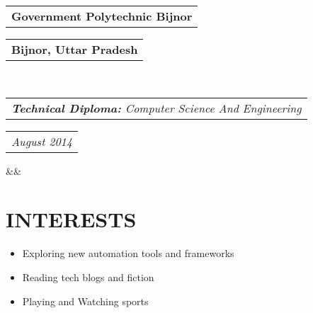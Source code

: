 \documentclass[11pt,a4paper]{moderncv}
\makeatletter
\newcommand*{\customcventry}[7][.25em]{
  \begin{tabular}{@{}l} 
    {\bfseries #4}
  \end{tabular}
  \hfill
  \begin{tabular}{l@{}}
     {\bfseries #5}
  \end{tabular} \\
  \begin{tabular}{@{}l} 
    {\itshape #3}
  \end{tabular}
  \hfill
  \begin{tabular}{l@{}}
     {\itshape #2}
  \end{tabular}
  \ifx&#7&%
  \else{\\%
    \begin{minipage}{\maincolumnwidth}%
      \small#7%
    \end{minipage}}\fi%
  \par\addvspace{#1}}
\makeatother
\begin{document}
{\customcventry{August 2014}{\textbf {Technical Diploma:} Computer Science And Engineering}{Government Polytechnic Bijnor}{Bijnor, Uttar Pradesh}{}{}}
\vspace{-2mm}

\section{INTERESTS}
\vspace{-2mm}
\begin{itemize}
  \item Exploring new automation tools and frameworks
  \item Reading tech blogs and fiction
  \item Playing and Watching sports
\end{itemize}
\end{document}
